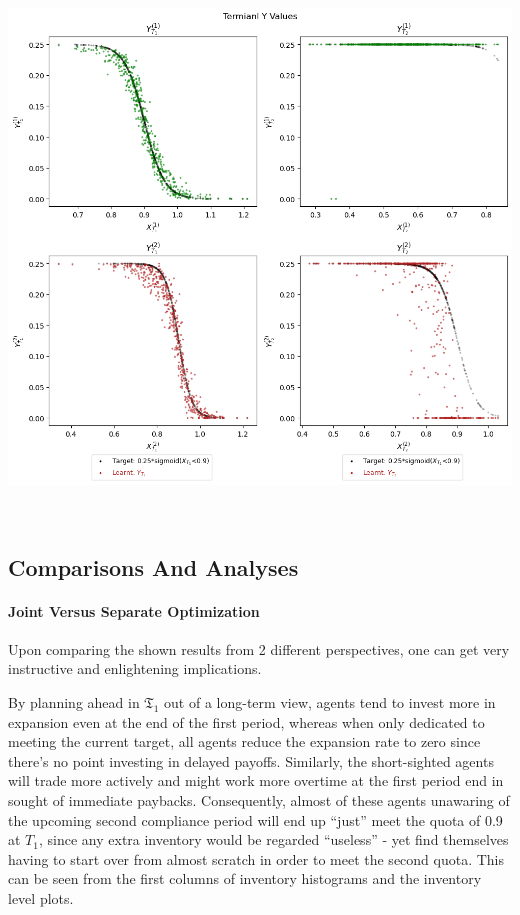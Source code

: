 \documentclass[a4paper,10pt]{article}
\newcommand{\1}{\mathbf{1}}
\begin{document}
\begin{minipage}{\textwidth}
\begin{minipage}[h]{0.65\textwidth}
    \includegraphics[]{FinalReports/Illustration_diagrams/Seprt-2A2P-Sigmoid-ResExamples/sigmoid_target.png}\\
    \label{fig:terminal-values-sep}
  \end{minipage}\\
  \vspace{-20pt}
\end{minipage}


\newpage  %

\subsection{Comparisons And Analyses}

\paragraph{Joint Versus Separate Optimization}

Upon comparing the shown results from 2 different perspectives, one can
get very instructive and enlightening implications.

By planning ahead in \(\mathfrak{T}_1\) out of a long-term view,
agents tend to invest more in expansion even at the end of the first
period, whereas when only dedicated to meeting the current target, all
agents reduce the expansion rate to zero since there's no point
investing in delayed payoffs. Similarly, the short-sighted agents will
trade more actively and might work more overtime at the first period end
in sought of immediate paybacks. Consequently, almost of these agents
unawaring of the upcoming second compliance period will end up ``just''
meet the quota of 0.9 at \(T_1\), since any extra inventory would be
regarded ``useless'' - yet find themselves having to start over from
almost scratch in order to meet the second quota. This can be seen from
the first columns of inventory histograms and the inventory level plots.
\end{document}
